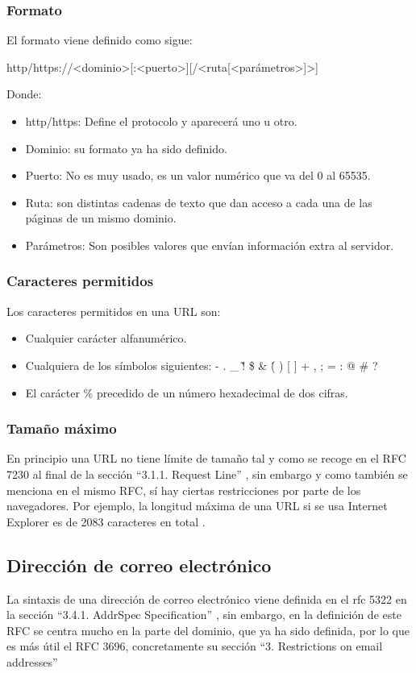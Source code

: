 \subsubsection{Formato}
El formato viene definido como sigue: 

{http/https}://<dominio>[:<puerto>][/<ruta[<parámetros>]>]

Donde:
\begin{itemize}
    \item http/https: Define el protocolo y aparecerá uno u otro. 
    \item Dominio: su formato ya ha sido definido.
    \item Puerto: No es muy usado, es un valor numérico que va del 0 al 65535.
    \item Ruta: son distintas cadenas de texto que dan acceso a cada una de las páginas de un mismo dominio.
    \item Parámetros: Son posibles valores que envían información extra al servidor. 
\end{itemize}

\subsubsection{Caracteres permitidos}
Los caracteres permitidos en una URL son:
\begin{itemize}
    \item Cualquier carácter alfanumérico.
    \item Cualquiera de los símbolos siguientes: - . \_ \~ ! \$ \& \' ( ) [ ] \* + , ; = : @ \# ? \/
    \item El carácter \% precedido de un número hexadecimal de dos cifras. 
\end{itemize}

\subsubsection{Tamaño máximo}
En principio una URL no tiene límite de tamaño tal y como se recoge en el RFC 7230 al final de la sección “3.1.1.  Request Line” \cite{rfc7230_section_3_1_1}, sin embargo y como también se menciona en el mismo RFC, sí hay ciertas restricciones por parte de los navegadores. Por ejemplo, la longitud máxima de una URL si se usa Internet Explorer es de 2083 caracteres en total \cite{maximum_url_length}.

\subsection{Dirección de correo electrónico}
La sintaxis de una dirección de correo electrónico viene definida en el rfc 5322 en la sección “3.4.1.  Addr\-Spec Specification” \cite{rfc5322_section_3_4_1}, sin embargo, en la definición de este RFC se centra mucho en la parte del dominio, que ya ha sido definida, por lo que es más útil el RFC 3696, concretamente su sección “3. Restrictions on email addresses” \cite{rfc3696_section_3}


